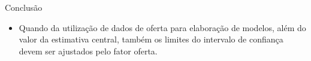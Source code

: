 \documentclass[9pt,ignorenonframetext,aspectratio=169]{beamer}
\newif\ifbibliography
\providecommand{\tightlist}{%
  \setlength{\itemsep}{0pt}\setlength{\parskip}{0pt}}
\begin{document}
\begin{frame}{Conclusão}

\begin{itemize}
\tightlist
\item
  Quando da utilização de dados de oferta para elaboração de modelos,
  além do valor da estimativa central, também os limites do intervalo de
  confiança devem ser ajustados pelo fator oferta.
\end{itemize}

\end{frame}


  \begin{frame}[allowframebreaks]{}
  \bibliographytrue
  \printbibliography[heading=none]
  \end{frame}
\end{document}
